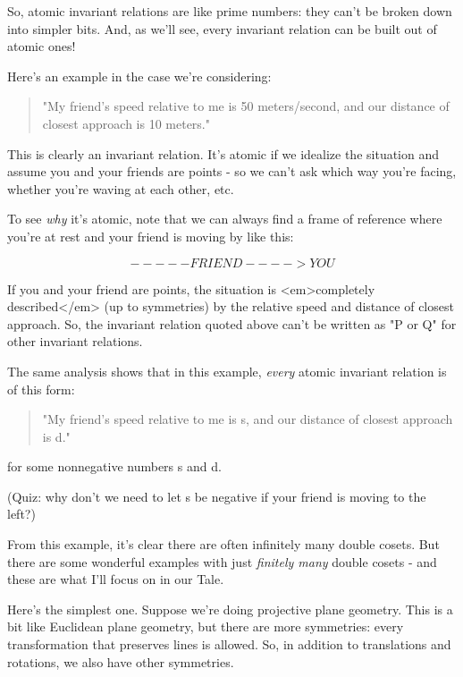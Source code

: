 So, atomic invariant relations are like prime numbers: they can't
be broken down into simpler bits.  And, as we'll see, every invariant
relation can be built out of atomic ones!  

Here's an example in the case we're considering:

\begin{quote}
  "My friend's speed relative to me is 50 meters/second, and our
   distance of closest approach is 10 meters."
\end{quote}

This is clearly an invariant relation.  It's atomic if we idealize 
the situation and assume you and your friends are points - so we 
can't ask which way you're facing, whether you're waving at each other, 
etc.

To see \emph{why} it's atomic, note that we can always find a frame of 
reference where you're at rest and your friend is moving by like this:


$$

              -----FRIEND---->


                    YOU
$$
    
If you and your friend are points, the situation is <em>completely 
described</em> (up to symmetries) by the relative speed and distance 
of closest approach.  So, the invariant relation quoted above 
can't be written as "P or Q" for other invariant relations.  

The same analysis shows that in this example, \emph{every} atomic invariant 
relation is of this form:

\begin{quote}
  "My friend's speed relative to me is s, and our distance of 
  closest approach is d."
\end{quote}

for some nonnegative numbers s and d.

(Quiz: why don't we need to let s be negative if your friend is moving 
to the left?)

From this example, it's clear there are often infinitely many
double cosets.  But there are some wonderful examples with just 
\emph{finitely many} double cosets - and these are what I'll focus
on in our Tale.

Here's the simplest one.  Suppose we're doing projective plane 
geometry.  This is a bit like Euclidean plane geometry, but there are
more symmetries: every transformation that preserves lines is allowed.
So, in addition to translations and rotations, we also have other 
symmetries.  


